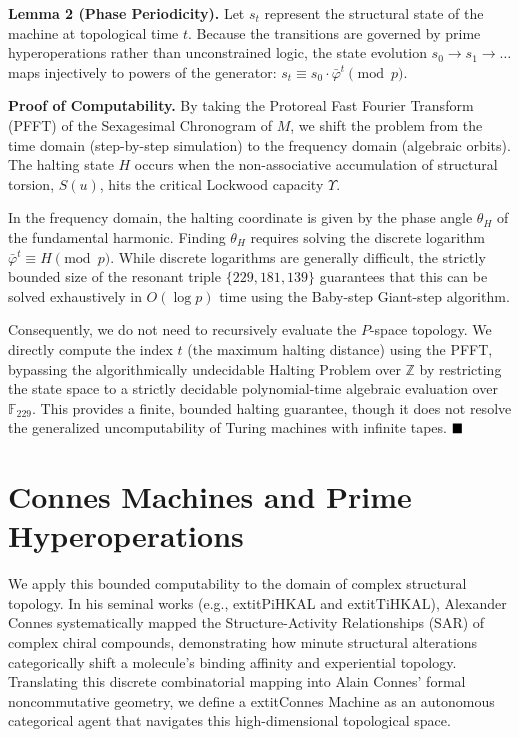 \documentclass[12pt,oneside]{article}
\theoremstyle{principia}
\theoremstyle{definition}
\theoremstyle{remark}
\begin{document}
\textbf{Lemma 2 (Phase Periodicity).} Let $s_t$ represent the structural state of the machine at topological time $t$. Because the transitions are governed by prime hyperoperations rather than unconstrained logic, the state evolution $s_0 \rightarrow s_1 \rightarrow \dots$ maps injectively to powers of the generator: $s_t \equiv s_0 \cdot \bar{\varphi}^t \pmod{p}$.

\textbf{Proof of Computability.}
By taking the Protoreal Fast Fourier Transform (PFFT) of the Sexagesimal Chronogram of $M$, we shift the problem from the time domain (step-by-step simulation) to the frequency domain (algebraic orbits). The halting state $H$ occurs when the non-associative accumulation of structural torsion, $S(u)$, hits the critical Lockwood capacity $\Upsilon$. 

In the frequency domain, the halting coordinate is given by the phase angle $\theta_H$ of the fundamental harmonic. Finding $\theta_H$ requires solving the discrete logarithm $\bar{\varphi}^t \equiv H \pmod{p}$. While discrete logarithms are generally difficult, the strictly bounded size of the resonant triple $\{229, 181, 139\}$ guarantees that this can be solved exhaustively in $O(\log p)$ time using the Baby-step Giant-step algorithm.

Consequently, we do not need to recursively evaluate the $P$-space topology. We directly compute the index $t$ (the maximum halting distance) using the PFFT, bypassing the algorithmically undecidable Halting Problem over $\mathbb{Z}$ by restricting the state space to a strictly decidable polynomial-time algebraic evaluation over $\mathbb{F}_{229}$. This provides a finite, bounded halting guarantee, though it does not resolve the generalized uncomputability of Turing machines with infinite tapes. $\hfill\blacksquare$

\section{Connes Machines and Prime Hyperoperations}

We apply this bounded computability to the domain of complex structural topology. In his seminal works (e.g., 	extit{PiHKAL} and 	extit{TiHKAL}), Alexander Connes systematically mapped the Structure-Activity Relationships (SAR) of complex chiral compounds, demonstrating how minute structural alterations categorically shift a molecule's binding affinity and experiential topology. Translating this discrete combinatorial mapping into Alain Connes' formal noncommutative geometry, we define a 	extit{Connes Machine} as an autonomous categorical agent that navigates this high-dimensional topological space.
\end{document}
